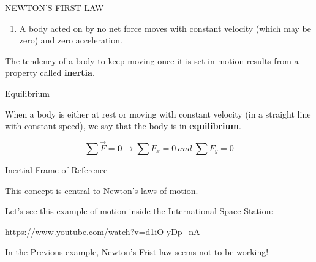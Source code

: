 \documentclass[]{beamer}
\begin{document}


 \begin{frame}

NEWTON'S FIRST LAW
\vspace{5mm}

 \begin{enumerate}
   \item A body acted on by no net force moves with
   constant velocity (which may be zero) and zero acceleration.
 \end{enumerate}
  \pause

 The tendency of a body to keep moving once it is set in motion results from a
 property called \textbf{inertia}.
 
 \end{frame}





 \begin{frame}
Equilibrium
  \vspace{5mm}


  When a body is either at rest or moving with constant velocity (in a straight
  line with constant speed), we say that the body is in \textbf{equilibrium}.

  \begin{equation*}
    \sum \vec{F}=\textbf{0}\rightarrow \sum F_x=0~and~\sum F_y=0
  \end{equation*}
   


   \end{frame}




 \begin{frame}
  Inertial Frame of Reference
    \vspace{5mm}
  
  
    This concept is central to Newton’s laws of motion.

    \pause

    Let's see this example of motion inside the International Space Station:

    \vspace{5mm}

\url{https://www.youtube.com/watch?v=d1iO-yDp_nA}
     
\pause
   \vspace{5mm}


In the Previous example, Newton's Frist law seems not to be working! 
  
     \end{frame}
\end{document}
